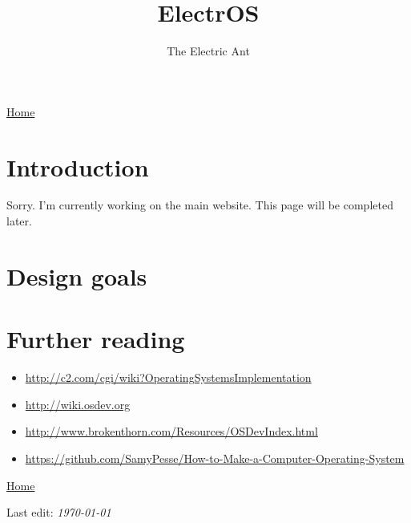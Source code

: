 \documentclass{article}
\title{ElectrOS}
\date {}
\author{The Electric Ant}
\def\wl{\par \noindent \vspace{\lineskip}}
\begin{document}
\maketitle
\href{index.html}{Home}
\tableofcontents
%
%
\section {Introduction}
Sorry. I'm currently working on the main website. This page will be completed later.
\section {Design goals}

\section {Further reading}
\begin{itemize}
      \item \url{http://c2.com/cgi/wiki?OperatingSystemsImplementation}
      \item \url{http://wiki.osdev.org}
      \item \url{http://www.brokenthorn.com/Resources/OSDevIndex.html}
      \item \url{https://github.com/SamyPesse/How-to-Make-a-Computer-Operating-System}

\end{itemize}
\wl
\href{index.html}{Home}
\wl
Last edit: \emph{\today}
\end{document}
